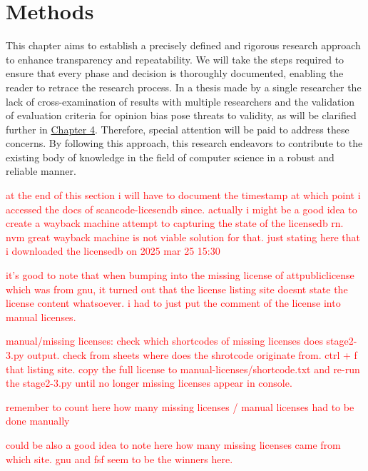 \chapter{Methods\label{methods}}
This chapter aims to establish a precisely defined and rigorous research approach to enhance transparency and repeatability. We will take the steps required to ensure that every phase and decision is thoroughly documented, enabling the reader to retrace the research process. In a thesis made by a single researcher the lack of cross-examination of results with multiple researchers and the validation of evaluation criteria for opinion bias pose threats to validity, as will be clarified further in \hyperref[discussion]{Chapter 4}. Therefore, special attention will be paid to address these concerns. By following this approach, this research endeavors to contribute to the existing body of knowledge in the field of computer science in a robust and reliable manner.

\textcolor{red}{at the end of this section i will have to document the timestamp at which point i accessed the docs of scancode-licesendb since. actually i might be a good idea to create a wayback machine attempt to capturing the state of the licensedb rn. nvm great wayback machine is not viable solution for that. just stating here that i downloaded the licensedb on 2025 mar 25 15:30}

\textcolor{red}{it's good to note that when bumping into the missing license of attpubliclicense which was from gnu, it turned out that the license listing site doesnt state the license content whatsoever. i had to just put the comment of the license into manual licenses.}

\textcolor{red}{manual/missing licenses: check which shortcodes of missing licenses does stage2-3.py output. check from sheets where does the shrotcode originate from. ctrl + f that listing site. copy the full license to manual-licenses/shortcode.txt and re-run the stage2-3.py until no longer missing licenses appear in console.}

\textcolor{red}{remember to count here how many missing licenses / manual licenses had to be done manually}

\textcolor{red}{could be also a good idea to note here how many missing licenses came from which site. gnu and fsf seem to be the winners here.}

